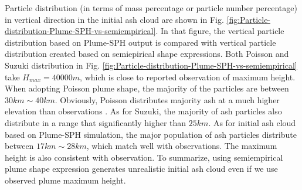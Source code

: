 \documentclass[draft,linenumbers]{agujournal2019}
\begin{document}
Particle distribution (in terms of mass percentage or particle number percentage) in vertical direction in the initial ash cloud are shown in Fig. \ref{fig:Particle-distribution-Plume-SPH-vs-semiempirical}. In that figure, the vertical particle distribution based on Plume-SPH output is compared with vertical particle distribution created based on semiepirical shape expressions. Both Poisson and Suzuki distribution in Fig. \ref{fig:Particle-distribution-Plume-SPH-vs-semiempirical} take $H_{max} = 40000m$, which is close to reported observation of maximum height. When adopting Poisson plume shape, the majority of the particles are between $30 km \sim 40 km$. Obviously, Poisson distributes majority ash at a much higher elevation than observations \citep[e.g.][]{fero2008simulation}. As for Suzuki, the majority of ash particles also distribute in a range that significantly higher than $25 km$. As for initial ash cloud based on Plume-SPH simulation, the major population of ash particles distribute between $17 km \sim 28 km$, which match well with observations. The maximum height is also consistent with observation. To summarize, using semiempirical plume shape expression generates unrealistic initial ash cloud even if we use observed plume maximum height.
\end{document}
